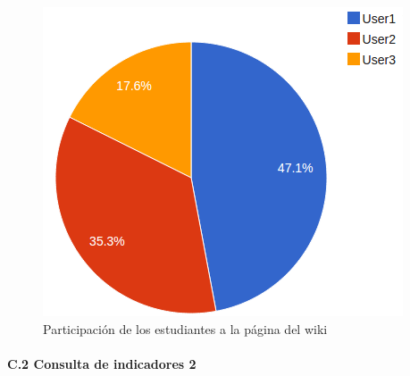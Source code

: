\begin{figure}[h]
 \begin{center}
    \includegraphics[scale=0.65]{santa_pie.png}
  \end{center}
  \caption{Participación de los estudiantes a la página del wiki}
  \label{fig:SantaPie}
\end{figure}

\newpage






	\paragraph*{C.2 Consulta de indicadores 2}

